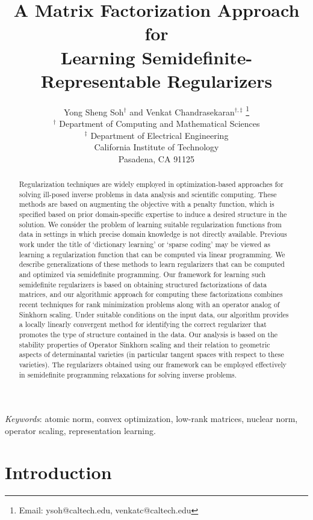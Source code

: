 \documentclass[11pt,letterpaper]{article}
\title{A Matrix Factorization Approach for \\ Learning Semidefinite-Representable Regularizers}
\author{Yong Sheng Soh$^\dag$ and Venkat Chandrasekaran$^{\dag,\ddag}$ \thanks{Email: ysoh@caltech.edu, venkatc@caltech.edu} \vspace{0.25in} \\ $^\dag$ Department of Computing and Mathematical Sciences\\ $^\ddag$ Department of Electrical Engineering \\ California Institute of Technology \\ Pasadena, CA 91125}
\begin{document}
\maketitle

\begin{abstract}
Regularization techniques are widely employed in optimization-based approaches for solving ill-posed inverse problems in data analysis and scientific computing.  These methods are based on augmenting the objective with a penalty function, which is specified based on prior domain-specific expertise to induce a desired structure in the solution.  We consider the problem of learning suitable regularization functions from data in settings in which precise domain knowledge is not directly available.  Previous work under the title of `dictionary learning' or `sparse coding' may be viewed as learning a regularization function that can be computed via linear programming.  We describe generalizations of these methods to learn regularizers that can be computed and optimized via semidefinite programming.  Our framework for learning such semidefinite regularizers is based on obtaining structured factorizations of data matrices, and our algorithmic approach for computing these factorizations combines recent techniques for rank minimization problems along with an operator analog of Sinkhorn scaling.  Under suitable conditions on the input data, our algorithm provides a locally linearly convergent method for identifying the correct regularizer that promotes the type of structure contained in the data.  Our analysis is based on the stability properties of Operator Sinkhorn scaling and their relation to geometric aspects of determinantal varieties (in particular tangent spaces with respect to these varieties). The regularizers obtained using our framework can be employed effectively in semidefinite programming relaxations for solving inverse problems.
\end{abstract}

\emph{Keywords}: atomic norm, convex optimization, low-rank matrices, nuclear norm, operator scaling, representation learning.

\section{Introduction} \label{sec:intro}

%
%
%
%
%
\end{document}
